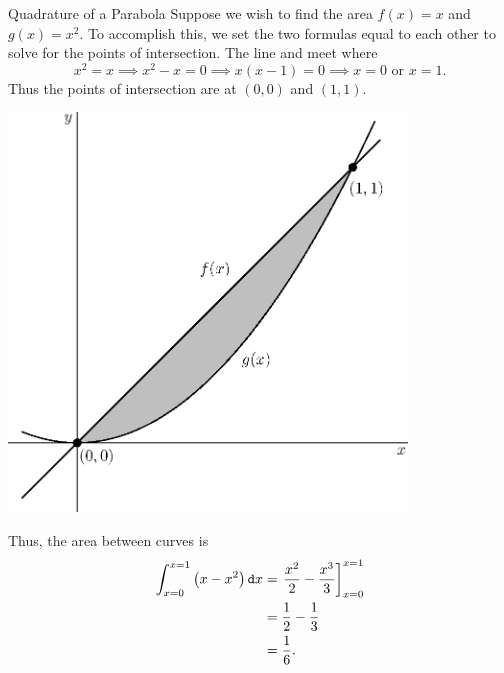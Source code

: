 \begin{example}{Quadrature of a Parabola}
 Suppose we wish to find the area  $f(x)=x$ and $g(x)=x^2$.  To accomplish this, we set the two formulas equal to each other to solve for the points of intersection.  The line and  meet where  $$x^2=x \implies x^2-x=0 \implies x(x-1)=0 \implies x=0 \text{ or }  x=1.$$ 
Thus the points of intersection are at $(0,0)$ and $(1,1)$. 

	\begin{center}
\includegraphics[width=300pt]{ChapterGeom/Figures/areabtparablin.eps}
	\end{center}
Thus, the area between curves is \begin{align*}
\int_{x=0}^{x=1}\left(x-x^2\right) \mathop{}\!\mathtt{d} x &= \left. \frac{x^2}{2}-\frac{x^3}{3}\right]_{x=0}^{x=1} \\
&=\frac{1}{2}-\frac{1}{3}\\
&=\frac{1}{6}.
\end{align*}
\end{example}

